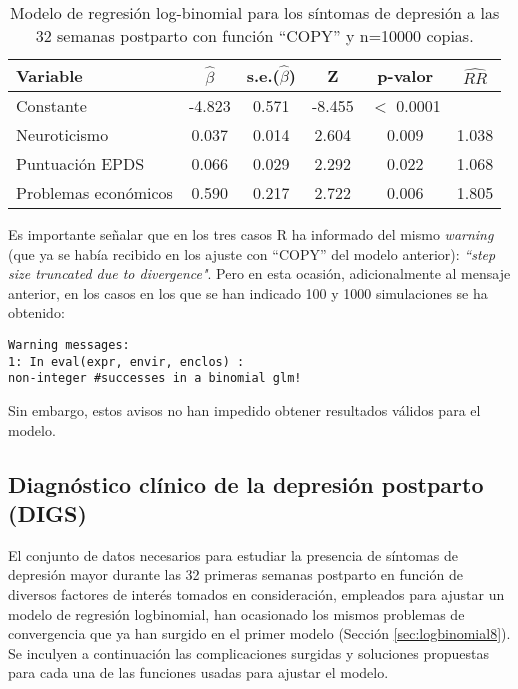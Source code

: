 \begin{table} [H]
	\centering
	\begin{tabular}{l c c c c c}
		\toprule
		\textbf{Variable} & $\hat{\beta}$ & s.e.($\hat{\beta}$) & Z & p-valor & $\widehat{RR}$\\
		\midrule
		Constante &   -4.823  &  0.571 & -8.455 & $<$ 0.0001 &  \\
		Neuroticismo &  0.037   & 0.014  & 2.604&  0.009 & 1.038  \\
		Puntuación EPDS &  0.066 &  0.029 &  2.292&  0.022& 1.068\\
		Problemas económicos &  0.590   &0.217  &2.722 & 0.006 & 1.805 \\
		\bottomrule
	\end{tabular}
	\caption{Modelo de regresión log-binomial para los síntomas de depresión a las 32 semanas postparto con función ``COPY'' y n=10000 copias.}
	\label{tab:14}
\end{table}
Es importante señalar que en los tres casos R ha informado del mismo \textit{warning} (que ya se había recibido en los ajuste con ``COPY'' del modelo anterior): \textit{``step size truncated due to divergence"}. Pero en esta ocasión, adicionalmente al mensaje anterior, en los casos en los que se han indicado 100 y 1000 simulaciones se ha obtenido:
\begin{Verbatim}[xleftmargin=2.5cm]
Warning messages:
1: In eval(expr, envir, enclos) :
non-integer #successes in a binomial glm!
\end{Verbatim}

Sin embargo, estos avisos no han impedido obtener resultados válidos para el modelo. 

\subsection{Diagnóstico clínico de la depresión postparto (DIGS)}
El conjunto de datos necesarios para estudiar la presencia de síntomas de depresión mayor durante las 32 primeras semanas postparto en función de diversos factores de interés tomados en consideración, empleados para ajustar un modelo de regresión logbinomial, han ocasionado los mismos problemas de convergencia que ya han surgido en el primer modelo (Sección \ref{sec:logbinomial8}). \\

Se inculyen a continuación las complicaciones surgidas y soluciones propuestas para cada una de las funciones usadas para ajustar el modelo.\\ 

